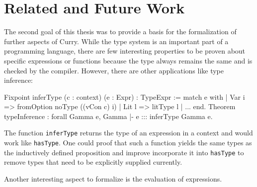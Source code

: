 \documentclass[paper = a4, fleqn, abstract=on, twoside]{scrreprt}
\newcommand{\todo}[1]{\marginpar{\textbf{TODO:} #1}}
\begin{document}
\section{Related and Future Work}
The second goal of this thesis was to provide a basis for the formalization of further aspects of Curry. While the type system is an important part of a programming language, there are few interesting properties to be proven about specific expressions or functions because the type always remains the same and is checked by the compiler. However, there are other applications like type inference:
\begin{coqcode}
Fixpoint inferType (c : context) (e : Expr) : TypeExpr :=
  match e with
  | Var i => fromOption noType ((vCon c) i)
  | Lit l => litType l
  | ...
  end.
Theorem typeInference : forall Gamma e, Gamma |- e ::: inferType Gamma e.
\end{coqcode}
The function \texttt{inferType} returns the type of an expression in a context and would work like \texttt{hasType}. One could proof that such a function yields the same types as the inductively defined proposition and improve incorporate it into \texttt{hasType} to remove types that need to be explicitly supplied currently.\\
\par
Another interesting aspect to formalize is the evaluation of expressions. 
\appendix



\end{document}
